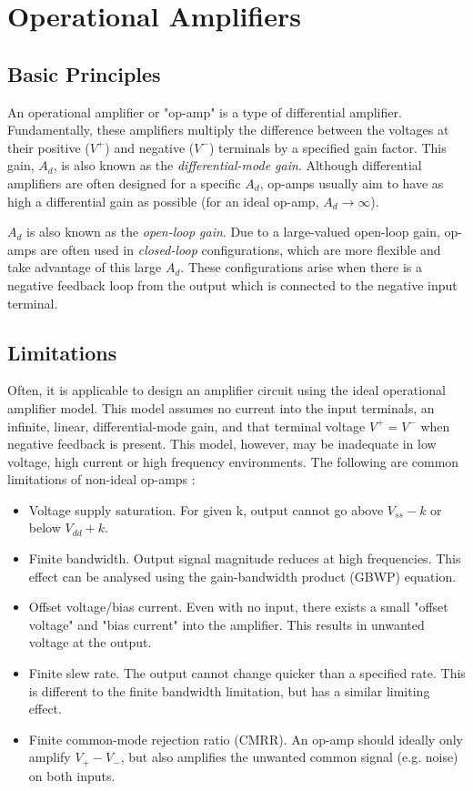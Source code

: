 \graphicspath{{content/1_literatureReview/figures/}}
\section{Operational Amplifiers}

\subsection{Basic Principles}
An operational amplifier or "op-amp" is a type of differential amplifier. Fundamentally, these amplifiers multiply the difference between the voltages
at their positive ($V^+$) and negative ($V^-$) terminals by a specified gain factor. This gain, $A_d$, is also known as the \textit{differential-mode gain}.
Although differential amplifiers are often designed for a specific $A_d$, op-amps usually aim to
have as high a differential gain as possible (for an ideal op-amp, $A_d \to \infty$).

$A_d$ is also known as the \textit{open-loop gain}. Due to a large-valued open-loop gain, op-amps are often used in \textit{closed-loop} configurations, which are more flexible
and take advantage of this large $A_d$. These configurations arise when there is a negative feedback loop from the output which is connected to the negative input terminal.

\subsection{Limitations}
Often, it is applicable to design an amplifier circuit using the ideal operational amplifier model. This model assumes no current into the input terminals, an infinite, linear,
differential-mode gain, and that terminal voltage $V^+ = V^-$ when negative feedback is present. This model, however, may be inadequate
in low voltage, high current or high frequency environments. The following are common limitations of non-ideal op-amps \cite{opAmpLimitations}:
\begin{itemize}
    \item Voltage supply saturation. For given k, output cannot go above $V_{ss} - k$ or below  $V_{dd} + k$.
    \item Finite bandwidth. Output signal magnitude reduces at high frequencies. This effect can be analysed using the gain-bandwidth product (GBWP) equation.
    \item Offset voltage/bias current. Even with no input, there exists a small "offset voltage" and "bias current" into the amplifier.
          This results in unwanted voltage at the output.
    \item Finite slew rate. The output cannot change quicker than a specified rate. This is different to the finite bandwidth limitation, but has a similar limiting effect.
    \item Finite common-mode rejection ratio (CMRR). An op-amp should ideally only amplify $V_{+} - V_{-}$, but also amplifies the unwanted common signal (e.g. noise) on both inputs.
\end{itemize}

